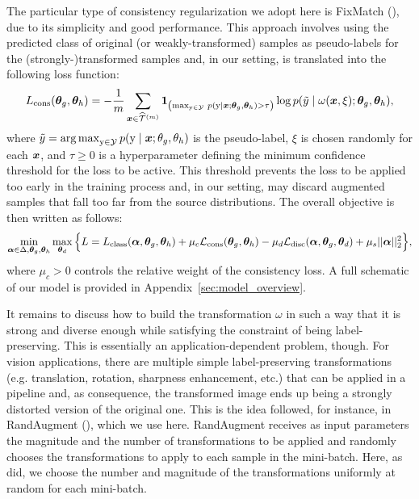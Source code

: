 The particular type of consistency regularization we adopt here is FixMatch (\citet{Sohn2020}), due to its simplicity and good performance. This approach involves using the predicted class of original (or weakly-transformed) samples as pseudo-labels for the (strongly-)transformed samples and, in our setting, is translated into the following loss function:
\begin{equation}
L_{\text{cons}}({\bm{\theta}}_g, {\bm{\theta}}_h) = -\frac{1}{m}\sum_{{\bm{x}} \in \widehat{{\mathcal{T}}}^{(m)}} \bm{1}_{\left(\max_{{\textnormal{y}} \in {\mathcal{Y}}}\, p({\textnormal{y}} \mid {\bm{x}}; {\bm{\theta}}_g, {\bm{\theta}}_h) > \tau \right)} \log p(\tilde{y} \mid \omega({\bm{x}}, \xi); {\bm{\theta}}_g, {\bm{\theta}}_h),
\end{equation}
where $\tilde{y} = \operatorname*{arg\,max}_{{\textnormal{y}} \in {\mathcal{Y}}} p({\textnormal{y}} \mid {\bm{x}}; \theta_g, \theta_h)$ is the pseudo-label, $\xi$ is chosen randomly for each ${\bm{x}}$, and $\tau \geq 0$ is a hyperparameter defining the minimum confidence threshold for the loss to be active. This threshold prevents the loss to be applied too early in the training process and, in our setting, may discard augmented samples that fall too far from the source distributions. The overall objective is then written as follows:
\begin{equation}
\min_{{\bm{\alpha}} \in \Delta, {\bm{\theta}}_g, {\bm{\theta}}_h}\max_{{\bm{\theta}}_d} \Big\{ L = L_\text{class}({\bm{\alpha}}, {\bm{\theta}}_g, {\bm{\theta}}_h) + \mu_c {\mathcal{L}}_\text{cons}({\bm{\theta}}_g, {\bm{\theta}}_h) - \mu_d {\mathcal{L}}_\text{disc}({\bm{\alpha}}, {\bm{\theta}}_g, {\bm{\theta}}_d) + \mu_s ||{\bm{\alpha}}||_2^2 \Big\},
\end{equation}
where $\mu_c > 0$ controls the relative weight of the consistency loss. A full schematic of our model is provided in Appendix~\ref{sec:model_overview}.

It remains to discuss how to build the transformation $\omega$ in such a way that it is strong and diverse enough while satisfying the constraint of being label-preserving. This is essentially an application-dependent problem, though. For vision applications, there are multiple simple label-preserving transformations (e.g. translation, rotation, sharpness enhancement, etc.) that can be applied in a pipeline and, as consequence, the transformed image ends up being a strongly distorted version of the original one. This is the idea followed, for instance, in RandAugment (\citet{Cubuk2019}), which we use here. RandAugment receives as input parameters the magnitude and the number of transformations to be applied and randomly chooses the transformations to apply to each sample in the mini-batch. Here, as \citet{Sohn2020} did, we choose the number and magnitude of the transformations uniformly at random for each mini-batch.

